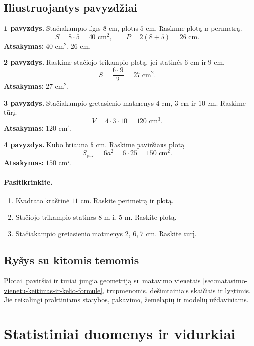 \subsection{Iliustruojantys pavyzdžiai}
\textbf{1 pavyzdys.} Stačiakampio ilgis \(8\) cm, plotis \(5\) cm. Raskime plotą ir perimetrą.
\[
S=8\cdot 5=40\text{ cm}^2,\qquad P=2(8+5)=26\text{ cm}.
\]
\textbf{Atsakymas:} \(40\text{ cm}^2\), \(26\) cm.

\textbf{2 pavyzdys.} Raskime stačiojo trikampio plotą, jei statinės \(6\) cm ir \(9\) cm.
\[
S=\frac{6\cdot 9}{2}=27\text{ cm}^2.
\]
\textbf{Atsakymas:} \(27\text{ cm}^2\).

\textbf{3 pavyzdys.} Stačiakampio gretasienio matmenys \(4\) cm, \(3\) cm ir \(10\) cm. Raskime tūrį.
\[
V=4\cdot 3\cdot 10=120\text{ cm}^3.
\]
\textbf{Atsakymas:} \(120\text{ cm}^3\).

\textbf{4 pavyzdys.} Kubo briauna \(5\) cm. Raskime paviršiaus plotą.
\[
S_{\text{pav}}=6a^2=6\cdot 25=150\text{ cm}^2.
\]
\textbf{Atsakymas:} \(150\text{ cm}^2\).

\paragraph{Pasitikrinkite.}
\begin{enumerate}[label=\arabic*.]
\item Kvadrato kraštinė \(11\) cm. Raskite perimetrą ir plotą.
\item Stačiojo trikampio statinės \(8\) m ir \(5\) m. Raskite plotą.
\item Stačiakampio gretasienio matmenys \(2\), \(6\), \(7\) cm. Raskite tūrį.
\end{enumerate}

\subsection{Ryšys su kitomis temomis}
Plotai, paviršiai ir tūriai jungia geometriją su matavimo vienetais \ref{sec:matavimo-vienetu-keitimas-ir-kelio-formule}, trupmenomis, dešimtainiais skaičiais ir lygtimis. Jie reikalingi praktiniams statybos, pakavimo, žemėlapių ir modelių uždaviniams.

\section{Statistiniai duomenys ir vidurkiai}\label{sec:statistiniai-duomenys-ir-vidurkiai}

